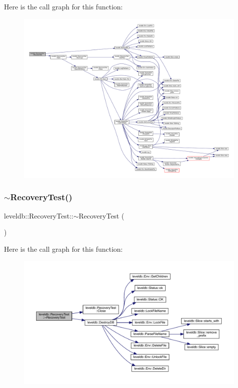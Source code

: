Here is the call graph for this function\+:
\nopagebreak
\begin{figure}[H]
\begin{center}
\leavevmode
\includegraphics[width=350pt]{classleveldb_1_1_recovery_test_a14ee3aa377807ae74d5b56ed879368c4_cgraph}
\end{center}
\end{figure}
\mbox{\label{classleveldb_1_1_recovery_test_acf396d9c48b2a5bdc1ed298210da1ac3}} 
\subsubsection{\texorpdfstring{$\sim$RecoveryTest()}{~RecoveryTest()}}
{\footnotesize\ttfamily leveldb\+::\+Recovery\+Test\+::$\sim$\+Recovery\+Test (\begin{DoxyParamCaption}{ }\end{DoxyParamCaption})\hspace{0.3cm}{\ttfamily [inline]}}

Here is the call graph for this function\+:
\nopagebreak
\begin{figure}[H]
\begin{center}
\leavevmode
\includegraphics[width=350pt]{classleveldb_1_1_recovery_test_acf396d9c48b2a5bdc1ed298210da1ac3_cgraph}
\end{center}
\end{figure}


